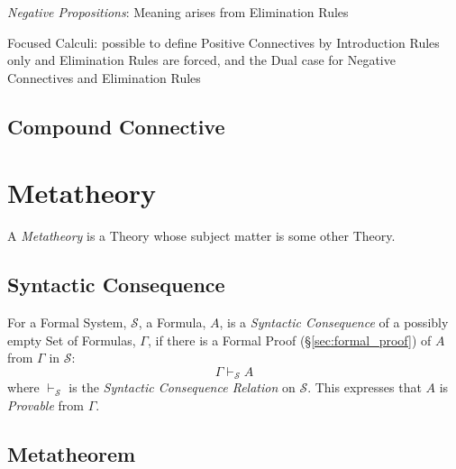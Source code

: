\emph{Negative Propositions}: Meaning arises from Elimination Rules

Focused Calculi: possible to define Positive Connectives by
Introduction Rules only and Elimination Rules are forced, and the Dual
case for Negative Connectives and Elimination Rules



\subsection{Compound Connective}\label{sec:compound_connective}



\section{Metatheory} \label{sec:metatheory}

A \emph{Metatheory} is a Theory whose subject matter is some other
Theory.



\subsection{Syntactic Consequence}\label{sec:syntactic_consequence}

For a Formal System, $\mathcal{S}$, a Formula, $A$, is a \emph{Syntactic
  Consequence} of a possibly empty Set of Formulas, $\Gamma$, if there
is a Formal Proof (\S\ref{sec:formal_proof}) of $A$ from $\Gamma$ in
$\mathcal{S}$:
\[
  \Gamma \vdash_{\mathcal{S}} A
\]
where $\vdash_{\mathcal{S}}$ is the \emph{Syntactic Consequence
  Relation} on $\mathcal{S}$. This expresses that $A$ is
\emph{Provable} from $\Gamma$.



\subsection{Metatheorem}\label{sec:metatheorem}


